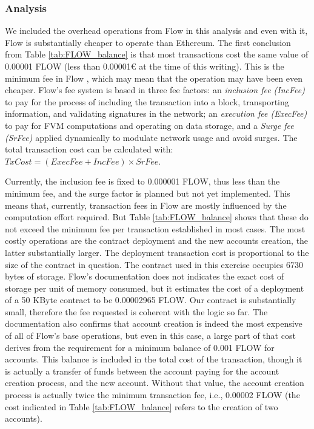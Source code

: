\documentclass[../NFTComp_IEEE.tex]{subfiles}
\begin{document}
\subsubsection{Analysis}
We included the overhead operations from Flow in this analysis and even with it, Flow is substantially cheaper to operate than Ethereum. The first conclusion from Table \ref{tab:FLOW_balance} is that most transactions cost the same value of 0.00001 FLOW (less than 0.00001€ at the time of this writing). This is the minimum fee in Flow \cite{flow2024d}, which may mean that the operation may have been even cheaper. Flow's fee system is based in three fee factors: an \textit{inclusion fee (IncFee)} to pay for the process of including the transaction into a block, transporting information, and validating signatures in the network; an \textit{execution fee (ExecFee)} to pay for FVM computations and operating on data storage, and a \textit{Surge fee (SrFee)} applied dynamically to modulate network usage and avoid surges. The total transaction cost can be calculated with: $ TxCost = (ExecFee + IncFee) \times SrFee $.
\par
Currently, the inclusion fee is fixed to 0.000001 FLOW, thus less than the minimum fee, and the surge factor is planned but not yet implemented. This means that, currently, transaction fees in Flow are mostly influenced by the computation effort required. But Table \ref{tab:FLOW_balance} shows that these do not exceed the minimum fee per transaction established in most cases. The most costly operations are the contract deployment and the new accounts creation, the latter substantially larger. The deployment transaction cost is proportional to the size of the contract in question. The contract used in this exercise occupies 6730 bytes of storage. Flow's documentation does not indicates the exact cost of storage per unit of memory consumed, but it estimates the cost of a deployment of a 50 KByte contract to be 0.00002965 FLOW. Our contract is substantially small, therefore the fee requested is coherent with the logic so far. The documentation also confirms that account creation is indeed the most expensive of all of Flow's base operations, but even in this case, a large part of that cost derives from the requirement for a minimum balance of 0.001 FLOW for accounts. This balance is included in the total cost of the transaction, though it is actually a transfer of funds between the account paying for the account creation process, and the new account. Without that value, the account creation process is actually twice the minimum transaction fee, i.e., 0.00002 FLOW (the cost indicated in Table \ref{tab:FLOW_balance} refers to the creation of two accounts).
\end{document}
